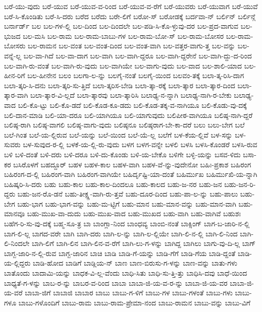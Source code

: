 {ಬರೆ-ಯು-ವುದು
ಬರೆ-ಯುವ
ಬರೆ-ಯುವ-ವ-ರಿಂದ
ಬರೆ-ಯುವ-ವ-ರೆಗೆ
ಬರೆ-ಯುವರು
ಬರೆ-ಯುವಾಗ
ಬರೆ-ಯುವೆ
ಬರೆ-ಸಿ-ಕೊಂಡಿತು
ಬರೆ-ಸಿ-ದರು
ಬರೆದ
ಬರೆದು
ಬರೇ-ಲಿಗೆ
ಬರೋ-ಸ್
ಬರೋಡಕ್ಕೆ
ಬರ್ದವಾ-ನ್
ಬರ್ಲಿನ್
ಬರ್ಲಿನ್ಗೆ
ಬರ್ನಾರ್ಡ್
ಬಲ
ಬಲ-ಗಳ-ಲ್ಲಿ
ಬಲ-ದಿಂದ
ಬಲ-ದಿಂದಲೇ
ಬಲ-ಪಡಿ-ಸಿ-ಕೊ-ಳ್ಳುವು-ದರ
ಬಲ-ಪ್ರದ-ವಾಗುವ
ಬಲ-ಭುಜದ
ಬಲ-ಮಸಿ
ಬಲ-ರಾಮ
ಬಲ-ರಾಮ-ಬಾಬು-ಗಳ
ಬಲ-ರಾಮ-ಬೋ-ಸ್
ಬಲ-ರಾಮ-ಬೋಸರ
ಬಲ-ರಾಮ-ಬೋಸರು
ಬಲ-ರಾಮನ
ಬಲ-ವಂತ
ಬಲ-ವಂತ-ದಿಂದ
ಬಲ-ವಂತ-ವಾಗಿ
ಬಲ-ವತ್ತರ-ವಾಗು-ತ್ತ
ಬಲ-ವನ್ನು
ಬಲ-ವನ್ನೆ-ಲ್ಲ
ಬಲ-ವಾ-ಗಿದೆ
ಬಲ-ವಾ-ದಾಗ
ಬಲ-ವಾಗಿ
ಬಲ-ವಾಗಿ-ದ್ದರೂ
ಬಲ-ವಾಗಿ-ದ್ದರೇನೆ
ಬಲ-ವಾಗಿ-ದ್ದು-ದ-ರಿಂದ
ಬಲ-ವಾಗಿ-ರು-ವಂತೆ
ಬಲ-ವಾಗಿ-ರು-ವುದು
ಬಲ-ವಾಗಿಯೇ
ಬಲ-ವಾಗು-ವುದು
ಬಲ-ವಾದ
ಬಲ-ಶಾಲಿ-ಯಾದ
ಬಲ-ಹೀನ-ರಿಗೆ
ಬಲ-ಹೀನೇನ
ಬಲಂ
ಬಲಗಾ-ಲ-ನ್ನು
ಬಲಗೈ-ನಂತೆ
ಬಲಗೈ-ಯಿಂದ
ಬಲವಂ-ತಕ್ಕೆ
ಬಲಾ-ತ್ಕ-ರಿಸಿ-ದಾಗ
ಬಲಾ-ತ್ಕರಿ-ಸಿ-ದನು
ಬಲಾ-ತ್ಕರಿ-ಸು-ತ್ತಿದೆ
ಬಲಾ-ತ್ಕರಿಸ-ಬೇಡಿ
ಬಲಾ-ತ್ಕಾ-ರಕ್ಕೆ
ಬಲಾ-ತ್ಕಾರ
ಬಲಾ-ತ್ಕಾರ-ದಿಂದ
ಬಲಾ-ತ್ಕಾರ-ವಾಗಿ
ಬಲಾ-ತ್ಕಾರ-ವಿ-ಲ್ಲದೆ
ಬಲಾ-ತ್ಕಾರವು
ಬಲಾ-ತ್ಕಾರಿಸಿ
ಬಲಾಢ್ಯ-ನ-ನ್ನಾಗಿ
ಬಲಾಢ್ಯ-ನಾಗಿ-ರ-ಬೇಕು
ಬಲಾಢ್ಯ-ವಾದ
ಬಲಿ-ಕೊ-ಟ್ಟು
ಬಲಿ-ಕೊ-ಡದೆ
ಬಲಿ-ಕೊಡ-ಕೂ-ಡದು
ಬಲಿ-ಕೊಡ-ತಕ್ಕ-ವ-ನಾಗಿಯೂ
ಬಲಿ-ಕೊಡು-ವು-ದಕ್ಕೆ
ಬಲಿ-ದಾನ-ಮಾಡಿ
ಬಲಿ-ಯಾ-ದರೂ
ಬಲಿ-ಯಾಗಿಯೂ
ಬಲಿ-ಯಾಗುವುದು
ಬಲಿಪೀಠ-ವಾಗಿಯೂ
ಬಲಿಷ್ಠ-ನಾಗಿ-ದ್ದರೆ
ಬಲಿಷ್ಠ-ರಾಗಿ
ಬಲಿಷ್ಠ-ವಾಗಲಿ
ಬಲಿಷ್ಠ-ವಾಗು-ವುದು
ಬಲಿಷ್ಠನೂ
ಬಲಿಷ್ಠರಾಗ-ಬೇ-ಕಾ-ದರೆ
ಬಲು
ಬಲು-ಬೇಗ
ಬಲೆ
ಬಲೆ-ಗಿಂತ
ಬಲೆ-ಯ-ಲ್ಲಿರುವ
ಬಲೆ-ಯನ್ನು
ಬಲೆ-ಯಿಂದ
ಬಲೆ-ಯೆ-ಲ್ಲ
ಬಲೆಗೆ
ಬಳ-ಕೆಯ-ಲ್ಲಿವೆ
ಬಳ-ಸನ್ನು
ಬಳ-ಸುವರು
ಬಳ-ಸುವುದ-ರ-ಲ್ಲಿ
ಬಳಕೆ-ಯ-ಲ್ಲಿ-ರು-ವುದು
ಬಳಗ
ಬಳಗ-ವನ್ನೇ
ಬಳಲಿ
ಬಳಸಿ
ಬಳಸಿ-ಕೊಂಡರೆ
ಬಳಸಿ-ರುವ
ಬಳಿ
ಬಳಿ-ದಂತೆ
ಬಳಿ-ದರು
ಬಳಿ-ದರೂ
ಬಳಿ-ದು-ಕೊಂಡು
ಬಳಿ-ಯ-ಬೇಕೊ
ಬಳಿಗೇ
ಬಳ್ಳಿ-ಯನ್ನು
ಬಸವ-ಳಿದು
ಬಸಾ-ಕರ
ಬಸಿರೊಳಗೆ
ಬಹದ್ದೂರ್
ಬಹಳ
ಬಹಳ-ಕಾಲ
ಬಹಳ-ವಾಗಿ
ಬಹಳ-ವೆ-ನ್ನು-ವುದೇನೋ
ಬಹಿಃ-ಪ್ರಕಾಶ
ಬಹಿರಂಗ
ಬಹಿರಂಗ-ದ-ಲ್ಲಿ
ಬಹಿರಂಗ-ವಾಗಿ
ಬಹಿರಂಗ-ವಾಗಿಯೇ
ಬಹಿರ್ದೃಷ್ಟಿ-ಯಾ-ದಂತೆ
ಬಹಿರ್ಮುಖ
ಬಹಿರ್ಮುಖಿ-ಯ-ನ್ನಾಗಿ
ಬಹಿಷ್ಕರಿ-ಸಿ-ದರು
ಬಹು
ಬಹು-ಕಾಲ
ಬಹು-ಕಾಲ-ದಿಂದಲೂ
ಬಹು-ಕಾಲದ
ಬಹು-ಜ-ನರ
ಬಹು-ಜನ
ಬಹು-ಜನ-ರಿ-ದ್ದರು
ಬಹು-ಜನ-ರೊ-ಡನೆ
ಬಹು-ತೀಕ್ಷ್ಣ-ವಾಗಿ-ರು-ತ್ತವೆ
ಬಹು-ದೂರ-ದಿಂದ
ಬಹು-ಪಾ-ಲ-ನ್ನು
ಬಹು-ಪಾಲು
ಬಹು-ಬೇಗ
ಬಹು-ಭಾಗ
ಬಹು-ಭಾಗ-ವನ್ನು
ಬಹು-ಮ-ಟ್ಟಿಗೆ
ಬಹು-ಮಾನ
ಬಹು-ಮಾನ-ವನ್ನು
ಬಹು-ಮಾನ-ವಾಗಿ
ಬಹು-ಮಾನವೂ
ಬಹು-ಮುಖ-ವಾ-ದುದು
ಬಹು-ಮುಖ-ವಾದ
ಬಹು-ಮುಖದ
ಬಹು-ವಾಗಿ
ಬಹು-ವಾಗಿವೆ
ಬಹುಶಃ
ಬಹೆಗ-ರಿ-ಸು-ವು-ದಕ್ಕೆ
ಬಹ್ಮ-ಸೂ-ತ್ರ
ಬಾ
ಬಾಂಗ್ಲಾ-ನಿಂದ
ಬಾಂಧವ್ಯ
ಬಾಂಬಿ-ನಂತೆ
ಬಾಕ್ಸಿಂಗ್
ಬಾಗ-ಬ-ಜಾರಿ-ನ-ಲ್ಲಿ
ಬಾಗ-ಲಿ-ಲ್ಲ
ಬಾಗದ-ವರೇ
ಬಾಗಿ
ಬಾಗಿ-ದರು
ಬಾಗಿ-ಲ-ನ್ನು
ಬಾಗಿ-ಲ-ಲ್ಲಿಯೇ
ಬಾಗಿ-ಲಿ-ನ-ಲ್ಲಿ
ಬಾಗಿ-ಲಿ-ನಿಂದ
ಬಾಗಿ-ಲಿ-ನಿಂದಲೇ
ಬಾಗಿ-ಲಿಗೆ
ಬಾಗಿ-ಲಿನ
ಬಾಗಿ-ಲಿನ-ವ-ರೆಗೆ
ಬಾಗಿ-ಲು-ಗ-ಳನ್ನು
ಬಾಗಿದ್ದ
ಬಾಗಿಲು
ಬಾಗು-ವು-ದಿ-ಲ್ಲ
ಬಾಗ್
ಬಾಗ್ಬ-ಜಾರಿ-ನ-ಲ್ಲಿ-ರುವ
ಬಾಗ್ಬ-ಜಾರಿನ
ಬಾಚಿ
ಬಾಡಿ
ಬಾಡಿ-ಗೆ-ಯನ್ನು
ಬಾಡಿ-ಗೆಗೆ
ಬಾಡಿ-ಗೆಯ
ಬಾಡಿ-ದ್ದಂತೆ
ಬಾಡಿ-ಯ-ಲ್ಲಿದ್ದರು
ಬಾಡಿ-ಹೋದ
ಬಾಡಿಗೆ
ಬಾಡ್ಲಿಯ-ನ್
ಬಾಣ
ಬಾಣ-ಬಿರುಸು-ಗ-ಳನ್ನು
ಬಾಣ-ವನ್ನು
ಬಾತು-ಗಳು
ಬಾತೊಂದು
ಬಾದಾಮಿ-ಯನ್ನು
ಬಾಧಕ-ವಿ-ಲ್ಲ-ವೆಂದು
ಬಾಧಿ-ಸಿತು
ಬಾಧಿ-ಸು-ತ್ತಿ-ತ್ತು
ಬಾಧಿಸಿ-ದವು
ಬಾಧೆ-ಯಿಂದ
ಬಾಧ್ಯತೆ-ಗ-ಳನ್ನು
ಬಾಬ-ರ-ನ್ನು
ಬಾಬರ-ವ-ರಿಂದ
ಬಾಬಾ
ಬಾಬಾ-ಜಿ-ಯ-ವ-ರ-ನ್ನು
ಬಾಬಾ-ಜಿ-ಯ-ವರ
ಬಾಬಾ-ಜಿ-ಯ-ವರೆ
ಬಾಬಾ-ಜಿಗೆ
ಬಾಬಾಜಿ
ಬಾಬಾರ
ಬಾಬು
ಬಾಬು-ಗ-ಳಿಗೆ
ಬಾಬು-ಗಳ
ಬಾಬು-ಗಳಂತೆ
ಬಾಬು-ಗಳು
ಬಾಬು-ಗಳೂ
ಬಾಬು-ಗಳೊಂದಿಗೆ
ಬಾಬು-ರಾಮ
ಬಾಬು-ರಾಮ-ಪ್ರೇಮಾ-ನಂದ
ಬಾಬು-ರಾಮನ
ಬಾಬು-ವನ್ನು
ಬಾಬು-ವಿಗೆ
}
